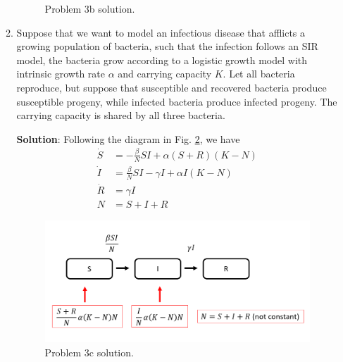 \documentclass[11pt]{article}
\begin{document}
\begin{enumerate}
\begin{enumerate}
\begin{figure}[H]
		\caption{Problem 3b solution.}
		\label{fig:3b}
	\end{figure}
	\item Suppose that we want to model an infectious disease that afflicts a growing population of bacteria, such that the infection follows an SIR model, the bacteria grow according to a logistic growth model with intrinsic growth rate $\alpha$ and carrying capacity $K$. Let all bacteria reproduce, but suppose that susceptible and recovered bacteria produce susceptible progeny, while infected bacteria produce infected progeny. The carrying capacity is shared by all three bacteria. 
	\begin{tcolorbox}
		\textbf{Solution}: Following the diagram in Fig. \ref{fig:3c}, we have
		\begin{align*}
			\dot{S} &=-\frac{\beta}{N}SI + \alpha (S+R)(K-N)\\
			\dot{I} &=\frac{\beta}{N}SI-\gamma I + \alpha I (K-N)\\
			\dot{R} &= \gamma I\\
			N &= S+I+R
		\end{align*}
	\end{tcolorbox}
	\begin{figure}[H]
		\centering
		\includegraphics[scale=0.5]{hw2p3c.png}
		\caption{Problem 3c solution.}
		\label{fig:3c}
	\end{figure}
\end{enumerate}

\end{enumerate}
\end{document}
